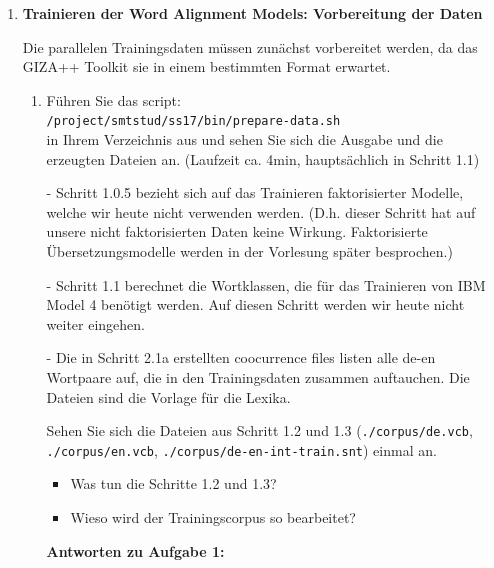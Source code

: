 \documentclass[12pt,fleqn]{article}
\begin{document}
\vspace{0.5cm} 
\begin{enumerate}

\item \textbf{Trainieren der Word Alignment Models: Vorbereitung der Daten} 

\vspace{0.5cm} 
Die parallelen Trainingsdaten müssen zunächst vorbereitet werden, da das GIZA++ Toolkit sie in einem bestimmten Format erwartet.

\vspace{0.5cm} 
\begin{enumerate} 
\item Führen Sie das script:  \\
\texttt{/project/smtstud/ss17/bin/prepare-data.sh} \\ 
in Ihrem Verzeichnis aus und sehen Sie sich die Ausgabe und die erzeugten Dateien an.
(Laufzeit ca. 4min, hauptsächlich in Schritt 1.1)

\vspace{0.5cm} 
- Schritt 1.0.5 bezieht sich auf das Trainieren faktorisierter Modelle, welche wir heute nicht verwenden werden. (D.h. dieser Schritt hat auf unsere nicht faktorisierten Daten keine Wirkung. Faktorisierte Übersetzungsmodelle werden in der Vorlesung später besprochen.)

\vspace{0.5cm} 
- Schritt 1.1 berechnet die Wortklassen, die für das Trainieren von IBM Model 4 benötigt werden. Auf diesen Schritt werden wir heute nicht weiter eingehen.

\vspace{0.5cm} 
- Die in Schritt 2.1a erstellten coocurrence files listen alle de-en Wortpaare auf, die in den Trainingsdaten zusammen auftauchen. Die Dateien sind die Vorlage für die Lexika.

\vspace{0.5cm} 
Sehen Sie sich die Dateien aus Schritt 1.2 und 1.3 (\texttt{./corpus/de.vcb}, \texttt{./corpus/en.vcb}, \texttt{./corpus/de-en-int-train.snt}) einmal an.


\vspace{0.5cm} 
\begin{itemize} 
\item Was tun die Schritte 1.2 und 1.3?
\item Wieso wird der Trainingscorpus so bearbeitet?
\end{itemize} 

\vspace{0.5cm} 
\textbf{Antworten zu Aufgabe 1:} \\ 


\end{enumerate}
\end{enumerate}
\end{document}
